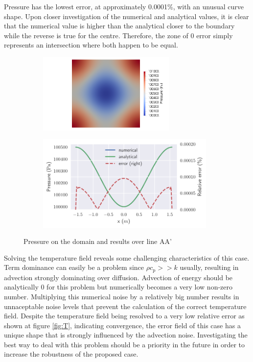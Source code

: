 Pressure has the lowest error, at approximately 0.0001\%, with an unusual curve shape.
Upon closer investigation of the numerical and analytical values, it is clear that the numerical value is higher than the analytical closer to the boundary while the reverse is true for the centre.
Therefore, the zone of 0 error simply represents an intersection where both happen to be equal.

\begin{figure}[htbp]
    \centering
    \begin{subfigure}[b]{0.42\textwidth}
        \includegraphics[width=68mm, trim={18cm 0 0 0}, clip]{3_results_and_discussion/figures/p.png}
    \end{subfigure}
    \begin{subfigure}[b]{0.56\textwidth}
        \includegraphics[width=88mm]{3_results_and_discussion/figures/pressure.pdf}
    \end{subfigure}
    \caption{Pressure on the domain and results over line AA'}
    \label{fig:p}
\end{figure}

Solving the temperature field reveals some challenging characteristics of this case.
Term dominance can easily be a problem since $ \rho c_{\text{p}} >> k $ usually, resulting in advection strongly dominating over diffusion.
Advection of energy should be analytically 0 for this problem but numerically becomes a very low non-zero number. Multiplying this numerical noise by a relatively big number results in unnaceptable noise levels that prevent the calculation of the correct temperature field.
Despite the temperature field being resolved to a very low relative error as shown at figure \ref{fig:T}, indicating convergence, the error field of this case has a unique shape that is strongly influenced by the advection noise.
Investigating the best way to deal with this problem should be a priority in the future in order to increase the robustness of the proposed case.

